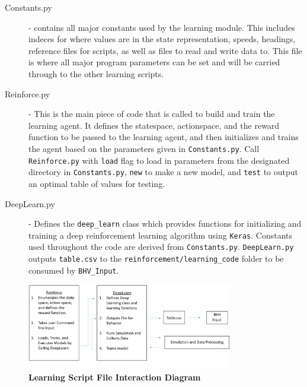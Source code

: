 \documentclass[onecolumn,letterpaper,11pt]{article}
\begin{document}
\begin{description}
	\item [Constants.py] - contains all major constants used by the learning module. This includes indeces for where values are in the state representation, speeds, headings, reference files for scripts, as well as files to read and write data to. This file is where all major program parameters can be set and will be carried through to the other learning scripts. 
	
	\item [Reinforce.py] - This is the main piece of code that is called to build and train the learning agent. It defines the statespace, actionspace, and the reward function to be passed to the learning agent, and then initializes and trains the agent based on the parameters given in \texttt{Constants.py}. Call \texttt{Reinforce.py} with \texttt{load} flag to load in parameters from the designated directory in \texttt{Constants.py}, \texttt{new} to make a new model, and \texttt{test} to output an optimal table of values for testing.
	
	\item [DeepLearn.py] - Defines the \texttt{deep\_learn} class which provides functions for initializing and training a deep reinforcement learning algorithm using \texttt{Keras}. Constants used throughout the code are derived from \texttt{Constants.py}. \texttt{DeepLearn.py} outputs \texttt{table.csv} to the \texttt{reinforcement/learning\_code} folder to be consumed by \texttt{BHV\_Input}.
\end{description}

\begin{figure}[H]
	\centering 
	\includegraphics[width=0.8\textwidth]{../Images/LearningInteractionDiagram.png}
	\caption{{\bf Learning Script File Interaction Diagram} }
	\label{fig_learn_diagram}
\end{figure}
\end{document}
